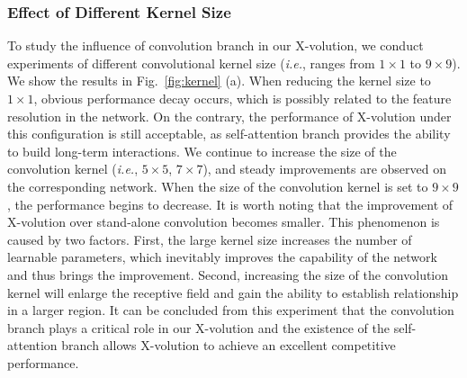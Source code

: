 \documentclass{article}
\begin{document}
\subsubsection{Effect of Different Kernel Size}
To study the influence of convolution branch in our X-volution, we conduct experiments of different convolutional kernel size (\emph{i.e.}, ranges from $1\times 1$ to $9 \times 9$).
We show the results in Fig.~\ref{fig:kernel} (a).
When reducing the kernel size to $1\times 1$, obvious performance decay occurs, which is possibly related to the feature resolution in the network. 
On the contrary, the performance of X-volution under this configuration is still acceptable, as self-attention branch provides the ability to build long-term interactions.
We continue to increase the size of the convolution kernel (\emph{i.e.}, $5\times 5$, $7\times 7$), and steady improvements are observed on the corresponding network. 
When the size of the convolution kernel is set to $9\times 9$, the performance begins to decrease.
It is worth noting that the improvement of X-volution over stand-alone convolution becomes smaller.
This phenomenon is caused by two factors.
First, the large kernel size increases the number of learnable parameters, which inevitably improves the capability of the network and thus brings the improvement.
Second, increasing the size of the convolution kernel will enlarge the receptive field and gain the ability to establish relationship in a larger region.
It can be concluded from this experiment that the convolution branch plays a critical role in our X-volution and the existence of the self-attention branch allows X-volution to achieve an excellent competitive performance.
\end{document}
